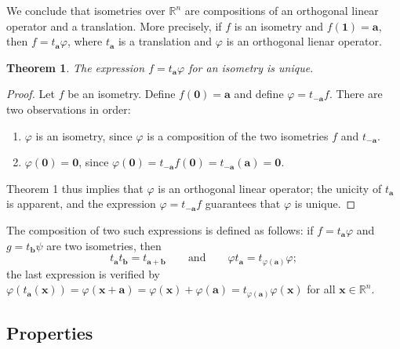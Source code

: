 \documentclass[11pt]{article}
\renewcommand{\vec}[1]{\mathbf{#1}}
\newtheorem{theorem}{Theorem}
\begin{document}
We conclude that isometries over $\mathbb{R}^{n}$ are compositions of an orthogonal linear operator and a translation. More precisely, if $f$ is an isometry and $f(\vec{1}) = \vec{a}$, then $f = t_{\vec{a}} \varphi$, where $t_{\vec{a}}$ is a translation and $\varphi$ is an orthogonal lienar operator.

\newpage

\begin{adjustwidth}{1cm}{}
	\begin{theorem}
		The expression $f = t_{\vec{a}} \varphi$ for an isometry is unique.
	\end{theorem}
	\begin{proof}
		Let $f$ be an isometry. Define $f(\vec{0}) = \vec{a}$ and define $\varphi = t_{-\vec{a}} f$. There are two observations in order:
		\begin{enumerate}
			\item $\varphi$ is an isometry, since $\varphi$ is a composition of the two isometries $f$ and $t_{-\vec{a}}$.
			\item $\varphi(\vec{0}) = \vec{0}$, since $\varphi(\vec{0}) = t_{-\vec{a}} f(\vec{0}) = t_{\vec{-a}} (\vec{a}) = \vec{0}$.
		\end{enumerate}
		Theorem 1 thus implies that $\varphi$ is an orthogonal linear operator; the unicity of $t_{\vec{a}}$ is apparent, and the expression $\varphi = t_{-\vec{a}} f$ guarantees that $\varphi$ is unique.
	\end{proof}
\end{adjustwidth}

The composition of two such expressions is defined as follows: if $f = t_{\vec{a}} \varphi$ and $g = t_{\vec{b}} \psi$ are two isometries, then
\[
	t_{\vec{a}} t_{\vec{b}} = t_{\vec{a} + \vec{b}} \qquad \text{and} \qquad \varphi t_{\vec{a}} = t_{\varphi(\vec{a})} \varphi;
\]
the last expression is verified by $\varphi(t_{\vec{a}}(\vec{x})) = \varphi(\vec{x} + \vec{a}) = \varphi(\vec{x}) + \varphi(\vec{a}) = t_{\varphi(\vec{a})} \varphi(\vec{x})$ for all $\vec{x} \in \mathbb{R}^{n}$.

\subsection{Properties}
\end{document}
